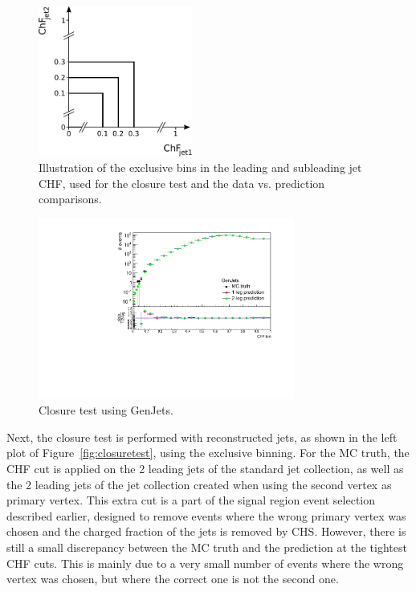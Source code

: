 \begin{figure}[ht]
  \centering
  \includegraphics[width=0.45\textwidth]{figures/exclusive_binning.pdf}\hfill%
  \caption{Illustration of the exclusive bins in the leading and subleading jet CHF, used for the closure test and the data vs. prediction comparisons.}
  \label{fig:excl_binning}
\end{figure}

\begin{figure}[ht]
  \centering
  \includegraphics[width=0.75\textwidth]{figures/closure_test_QCD_GenJets_exclusive_correct.pdf}\hfill%
  \caption{Closure test using GenJets.}
  \label{fig:closuretest_GenJets}
\end{figure}

Next, the closure test is performed with reconstructed jets, as shown in the left plot of Figure~\ref{fig:closuretest}, using the exclusive binning. For the MC truth, the CHF cut is applied on the 2 leading jets of the standard jet collection, as well as the 2 leading jets of the jet collection created when using the second vertex as primary vertex. This extra cut is a part of the signal region event selection described earlier, designed to remove events where the wrong primary vertex was chosen and the charged fraction of the jets is removed by \ac{CHS}. However, there is still a small discrepancy between the MC truth and the prediction at the tightest CHF cuts. This is mainly due to a very small number of events where the wrong vertex was chosen, but where the correct one is not the second one.


